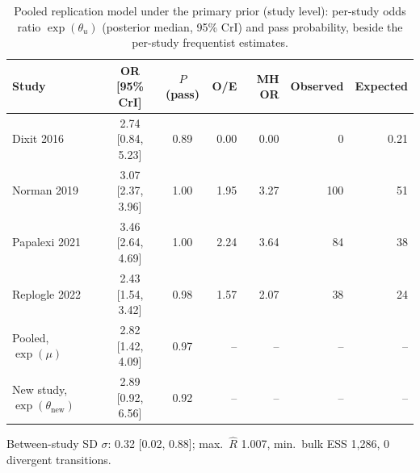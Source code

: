 \begin{table}[htbp]
\centering
\small
\caption{Pooled replication model under the primary prior (study level): per-study odds ratio $\exp(\theta_u)$ (posterior median, 95\% CrI) and pass probability, beside the per-study frequentist estimates.}
\label{tab:S-rep-bayes}
\begin{tabular}{@{}lccrrrr@{}}
\toprule
Study & OR [95\% CrI] & $P$(pass) & O/E & MH OR & Observed & Expected \\
\midrule
Dixit 2016 & 2.74 [0.84, 5.23] & 0.89 & 0.00 & 0.00 & 0 & 0.21 \\
Norman 2019 & 3.07 [2.37, 3.96] & 1.00 & 1.95 & 3.27 & 100 & 51 \\
Papalexi 2021 & 3.46 [2.64, 4.69] & 1.00 & 2.24 & 3.64 & 84 & 38 \\
Replogle 2022 & 2.43 [1.54, 3.42] & 0.98 & 1.57 & 2.07 & 38 & 24 \\
\midrule
Pooled, $\exp(\mu)$ & 2.82 [1.42, 4.09] & 0.97 & -- & -- & -- & -- \\
New study, $\exp(\theta_{\mathrm{new}})$ & 2.89 [0.92, 6.56] & 0.92 & -- & -- & -- & -- \\
\bottomrule
\end{tabular}
\par\smallskip
\begin{minipage}{\linewidth}\footnotesize
Between-study SD $\sigma$: 0.32 [0.02, 0.88]; max.\ $\widehat R$ 1.007, min.\ bulk ESS 1{,}286, 0 divergent transitions.
\end{minipage}
\end{table}
